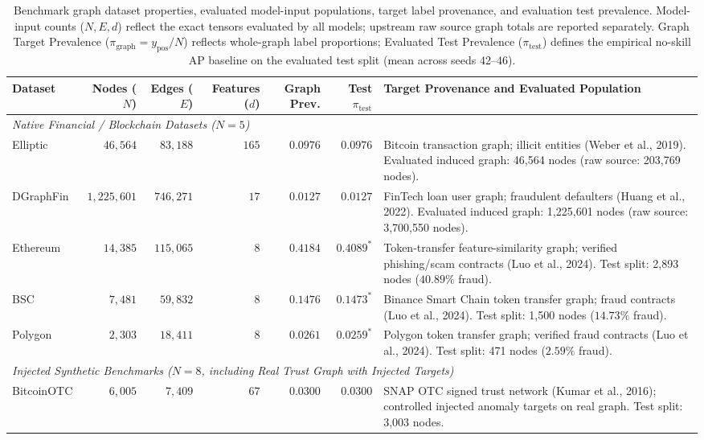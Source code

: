 \begin{table}[htbp]
\centering\small
\caption{Benchmark graph dataset properties, evaluated model-input populations, target label provenance, and evaluation test prevalence. Model-input counts ($N, E, d$) reflect the exact tensors evaluated by all models; upstream raw source graph totals are reported separately. Graph Target Prevalence ($\pi_{\mathrm{graph}} = y_{\mathrm{pos}} / N$) reflects whole-graph label proportions; Evaluated Test Prevalence ($\pi_{\mathrm{test}}$) defines the empirical no-skill AP baseline on the evaluated test split (mean across seeds 42--46).}
\label{tab:dataset_properties}
\begin{tabularx}{\textwidth}{lrrrrrX}\toprule
\textbf{Dataset} & \textbf{Nodes ($N$)} & \textbf{Edges ($E$)} & \textbf{Features ($d$)} & \textbf{Graph Prev.} & \textbf{Test $\pi_{\mathrm{test}}$} & \textbf{Target Provenance and Evaluated Population} \\\midrule
\multicolumn{7}{l}{\textit{Native Financial / Blockchain Datasets ($N=5$)}} \\
Elliptic & $46,564$ & $83,188$ & $165$ & $0.0976$ & $0.0976$ & Bitcoin transaction graph; illicit entities (Weber et al., 2019). Evaluated induced graph: 46,564 nodes (raw source: 203,769 nodes). \\
DGraphFin & $1,225,601$ & $746,271$ & $17$ & $0.0127$ & $0.0127$ & FinTech loan user graph; fraudulent defaulters (Huang et al., 2022). Evaluated induced graph: 1,225,601 nodes (raw source: 3,700,550 nodes). \\
Ethereum & $14,385$ & $115,065$ & $8$ & $0.4184$ & $0.4089^*$ & Token-transfer feature-similarity graph; verified phishing/scam contracts (Luo et al., 2024). Test split: 2,893 nodes ($40.89\%$ fraud). \\
BSC & $7,481$ & $59,832$ & $8$ & $0.1476$ & $0.1473^*$ & Binance Smart Chain token transfer graph; fraud contracts (Luo et al., 2024). Test split: 1,500 nodes ($14.73\%$ fraud). \\
Polygon & $2,303$ & $18,411$ & $8$ & $0.0261$ & $0.0259^*$ & Polygon token transfer graph; verified fraud contracts (Luo et al., 2024). Test split: 471 nodes ($2.59\%$ fraud). \\
\midrule
\multicolumn{7}{l}{\textit{Injected Synthetic Benchmarks ($N=8$, including Real Trust Graph with Injected Targets)}} \\
BitcoinOTC & $6,005$ & $7,409$ & $67$ & $0.0300$ & $0.0300$ & SNAP OTC signed trust network (Kumar et al., 2016); controlled injected anomaly targets on real graph. Test split: 3,003 nodes. \\

\end{tabularx}
\end{table}
